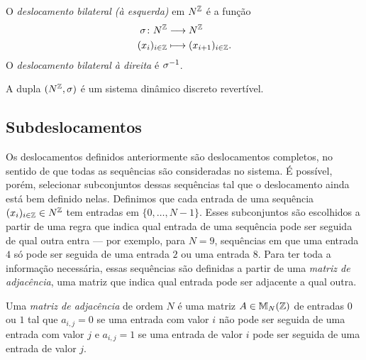 \begin{definition}
O \emph{deslocamento bilateral (à esquerda)} em $N^{\mathbb{Z}}$ é a função
	\begin{align*}
	{\sigma}\colon {N^{\mathbb{Z}}} &\longrightarrow {N^{\mathbb{Z}}} \\{(x_i)_{i \in \mathbb{Z}}} &\longmapsto (x_{i+1})_{i \in \mathbb{Z}}.
	\end{align*}
O \emph{deslocamento bilateral à direita} é $\sigma^{-1}$.
\end{definition}


\begin{proposition}
A dupla $(N^{\mathbb{Z}},\sigma)$ é um sistema dinâmico discreto revertível.
\end{proposition}

\subsection{Subdeslocamentos}

Os deslocamentos definidos anteriormente são deslocamentos completos, no sentido de que todas as sequências são consideradas no sistema. É possível, porém, selecionar subconjuntos dessas sequências tal que o deslocamento ainda está bem definido nelas. Definimos que cada entrada de uma sequência $(x_i)_{i \in \mathbb{Z}} \in N^{\mathbb{Z}}$ tem entradas em $\{0,\ldots,N-1\}$. Esses subconjuntos são escolhidos a partir de uma regra que indica qual entrada de uma sequência pode ser seguida de qual outra entra --- por exemplo, para $N=9$, sequências em que uma entrada $4$ só pode ser seguida de uma entrada $2$ ou uma entrada $8$. Para ter toda a informação necessária, essas sequências são definidas a partir de uma \emph{matriz de adjacência}, uma matriz que indica qual entrada pode ser adjacente a qual outra.

\begin{definition}
Uma \emph{matriz de adjacência} de ordem $N$ é uma matriz $A \in \mathbb{M}_N(\mathbb{Z})$ de entradas $0$ ou $1$ tal que $a_{i,j}=0$ se uma entrada com valor $i$ não pode ser seguida de uma entrada com valor $j$ e $a_{i,j}=1$ se uma entrada de valor $i$ pode ser seguida de uma entrada de valor $j$.
\end{definition}

